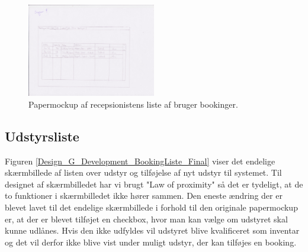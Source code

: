 \begin{figure}[h!]
  \centering
    \includegraphics[width=0.5\textwidth]{Appendix/GUI-Prototype/PaperMockup/GodkendBookinger_001}
  \caption{Papermockup af recepsionistens liste af bruger bookinger.}
\label{Design_G_Development_BookingListe}
\end{figure} 

\subsection{Udstyrsliste}
Figuren \ref{Design_G_Development_BookingListe_Final} viser det endelige skærmbillede af listen over udstyr og tilføjelse af nyt udstyr til systemet. Til designet af skærmbilledet har vi brugt "Law of proximity" så det er tydeligt, at de to funktioner i skærmbilledet ikke hører sammen. Den eneste ændring der er blevet lavet til det endelige skærmbillede  i forhold til den originale papermockup er, at der er blevet tilføjet en checkbox, hvor man kan vælge om udstyret skal kunne udlånes. Hvis den ikke udfyldes vil udstyret blive kvalificeret som inventar og det vil derfor ikke blive vist under muligt udstyr, der kan tilføjes en booking. 

